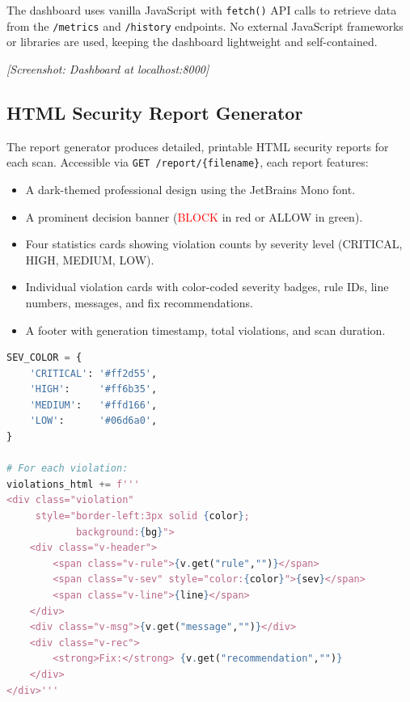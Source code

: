 The dashboard uses vanilla JavaScript with \texttt{fetch()} API calls to retrieve data from the \texttt{/metrics} and \texttt{/history} endpoints. No external JavaScript frameworks or libraries are used, keeping the dashboard lightweight and self-contained.


\textit{[Screenshot: Dashboard at localhost:8000]}

\subsection{HTML Security Report Generator}

The report generator produces detailed, printable HTML security reports for each scan. Accessible via \texttt{GET /report/\{filename\}}, each report features:

\begin{itemize}
    \item A dark-themed professional design using the JetBrains Mono font.
    \item A prominent decision banner (\textcolor{red}{BLOCK} in red or \textcolor{green!50!black}{ALLOW} in green).
    \item Four statistics cards showing violation counts by severity level (CRITICAL, HIGH, MEDIUM, LOW).
    \item Individual violation cards with color-coded severity badges, rule IDs, line numbers, messages, and fix recommendations.
    \item A footer with generation timestamp, total violations, and scan duration.
\end{itemize}

\begin{lstlisting}[language=Python, caption={Report generator — violation card rendering}, label={lst:report-violation}]
SEV_COLOR = {
    'CRITICAL': '#ff2d55',
    'HIGH':     '#ff6b35',
    'MEDIUM':   '#ffd166',
    'LOW':      '#06d6a0',
}

# For each violation:
violations_html += f'''
<div class="violation"
     style="border-left:3px solid {color};
            background:{bg}">
    <div class="v-header">
        <span class="v-rule">{v.get("rule","")}</span>
        <span class="v-sev" style="color:{color}">{sev}</span>
        <span class="v-line">{line}</span>
    </div>
    <div class="v-msg">{v.get("message","")}</div>
    <div class="v-rec">
        <strong>Fix:</strong> {v.get("recommendation","")}
    </div>
</div>'''
\end{lstlisting}

